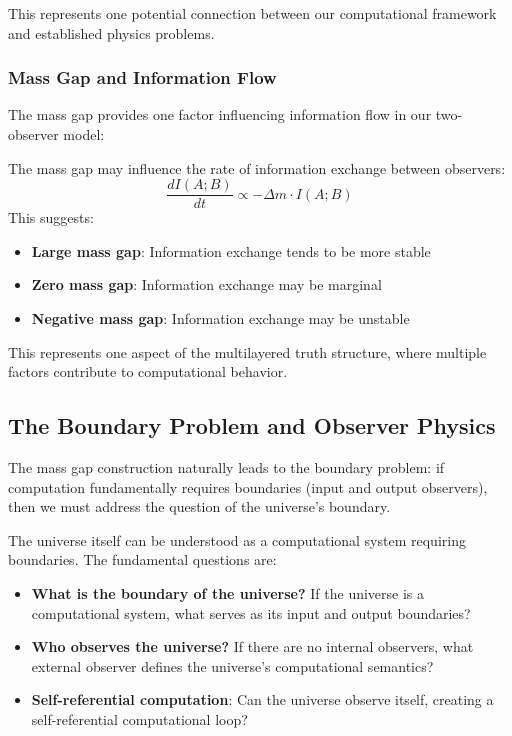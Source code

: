 This represents one potential connection between our computational framework and established physics problems.

\subsubsection{Mass Gap and Information Flow}

The mass gap provides one factor influencing information flow in our two-observer model:

\begin{proposition}
\label{prop:mass-gap-info-flow}
The mass gap may influence the rate of information exchange between observers:
\[
\frac{dI(A;B)}{dt} \propto -\Delta m \cdot I(A;B)
\]
This suggests:
\begin{itemize}
\item \textbf{Large mass gap}: Information exchange tends to be more stable
\item \textbf{Zero mass gap}: Information exchange may be marginal
\item \textbf{Negative mass gap}: Information exchange may be unstable
\end{itemize}
\end{proposition}

This represents one aspect of the multilayered truth structure, where multiple factors contribute to computational behavior.

\subsection{The Boundary Problem and Observer Physics}

The mass gap construction naturally leads to the boundary problem: if computation fundamentally requires boundaries (input and output observers), then we must address the question of the universe's boundary.

\begin{conjecture}
\label{conj:universal-boundary}
The universe itself can be understood as a computational system requiring boundaries. The fundamental questions are:
\begin{itemize}
\item \textbf{What is the boundary of the universe?} If the universe is a computational system, what serves as its input and output boundaries?
\item \textbf{Who observes the universe?} If there are no internal observers, what external observer defines the universe's computational semantics?
\item \textbf{Self-referential computation}: Can the universe observe itself, creating a self-referential computational loop?
\end{itemize}
\end{conjecture}


